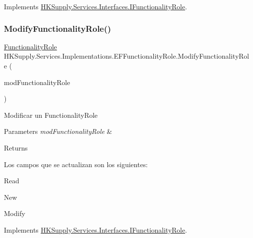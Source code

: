 Implements \hyperlink{interface_h_k_supply_1_1_services_1_1_interfaces_1_1_i_functionality_role}{H\+K\+Supply.\+Services.\+Interfaces.\+I\+Functionality\+Role}.

\mbox{\label{class_h_k_supply_1_1_services_1_1_implementations_1_1_e_f_functionality_role_a69bbb7f8593ea4e0e70ce96625cf80e4}} 
\subsubsection{\texorpdfstring{Modify\+Functionality\+Role()}{ModifyFunctionalityRole()}}
{\footnotesize\ttfamily \hyperlink{class_h_k_supply_1_1_models_1_1_functionality_role}{Functionality\+Role} H\+K\+Supply.\+Services.\+Implementations.\+E\+F\+Functionality\+Role.\+Modify\+Functionality\+Role (\begin{DoxyParamCaption}\item[{\hyperlink{class_h_k_supply_1_1_models_1_1_functionality_role}{Functionality\+Role}}]{mod\+Functionality\+Role }\end{DoxyParamCaption})}



Modificar un Functionality\+Role 


\begin{DoxyParams}{Parameters}
{\em mod\+Functionality\+Role} & \\
\hline
\end{DoxyParams}
\begin{DoxyReturn}{Returns}

\end{DoxyReturn}


Los campos que se actualizan son los siguientes\+:
\begin{DoxyItemize}
\item Read
\item New
\item Modify 
\end{DoxyItemize}

Implements \hyperlink{interface_h_k_supply_1_1_services_1_1_interfaces_1_1_i_functionality_role}{H\+K\+Supply.\+Services.\+Interfaces.\+I\+Functionality\+Role}.

